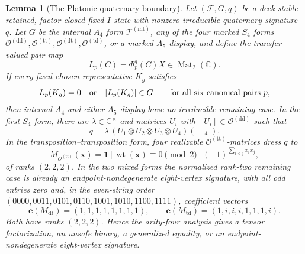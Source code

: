 \documentclass[11pt,letterpaper,onecolumn]{article}
\theoremstyle{plain}
\newtheorem{lemma}[lemma]{Lemma}
\theoremstyle{definition}
\theoremstyle{remark}
\newcommand{\cF}{\mathcal F}
\newcommand{\TetInt}{{\mathcal T^{(\mathrm{int})}}}
\newcommand{\OctDD}{{\mathcal O^{(\mathrm{dd})}}}
\newcommand{\OctTT}{{\mathcal O^{(\mathrm{tt})}}}
\newcommand{\OctDT}{{\mathcal O^{(\mathrm{dt})}}}
\newcommand{\OctTD}{{\mathcal O^{(\mathrm{td})}}}
\newcommand{\Mat}{\operatorname{Mat}}
\newcommand{\wt}{\operatorname{wt}}
\newcommand{\Eq}{=}
\newcommand{\one}{\mathbf 1}
\begin{document}
\begin{lemma}[The Platonic quaternary boundary]
\label{lem:platonic-quaternary-boundary}
Let \((\cF,G,q)\) be a deck-stable retained, factor-closed fixed-\(I\)
state with nonzero irreducible quaternary signature \(q\).
Let \(G\) be the internal \(A_4\) form \(\TetInt\), any of the four
marked \(S_4\) forms
\(\OctDD,\OctTT,\OctDT,\OctTD\), or a marked
\(A_5\) display, and
define the transfer-valued pair map
\begin{equation*}
  L_p(C)=\Phi_p^q(C)X\in\Mat_2(\mathbb C).
\end{equation*}
If every fixed chosen representative \(K_g\) satisfies
\begin{equation*}
  L_p(K_g)=0\quad\hbox{or}\quad [L_p(K_g)]\in G
  \qquad\text{for all six canonical pairs }p,
\end{equation*}
then internal \(A_4\) and either \(A_5\) display have no irreducible
remaining case.  In the first \(S_4\) form, there are
\(\lambda\in\mathbb C^\times\) and matrices \(U_i\) with
\([U_i]\in\OctDD\) such that
\begin{equation*}
  q=\lambda\,(U_1\otimes U_2\otimes U_3\otimes U_4)(\Eq_4).
\end{equation*}
In the transposition--transposition form, four realizable
\(\OctTT\)-matrices dress \(q\) to
\begin{equation}
  M_{\OctTT}({\mathbf{x}})
  =\one[\wt({\mathbf{x}})\equiv0\pmod2]
    (-1)^{\sum_{i<j}x_ix_j},
  \label{eq:p1-platonic-q4-Oprime-eight-vertex}
\end{equation}
of ranks \((2,2,2)\).  In the two mixed forms the normalized rank-two
remaining case is already an endpoint-nondegenerate eight-vertex signature, with
all odd entries zero and, in the even-string order
\((0000,0011,0101,0110,1001,1010,1100,1111)\), coefficient vectors
\begin{equation}
 \mathbf e(M_{\mathrm{dt}})=(1,1,1,1,1,1,1,1),\qquad
 \mathbf e(M_{\mathrm{td}})=(1,i,i,i,1,1,1,i).
 \label{eq:p1-platonic-q4-mixed-eight-vertex}
\end{equation}
Both have ranks \((2,2,2)\). Hence the arity-four analysis gives a
tensor factorization, an unsafe binary, a generalized equality, or an
endpoint-nondegenerate eight-vertex signature.
\end{lemma}
\end{document}
